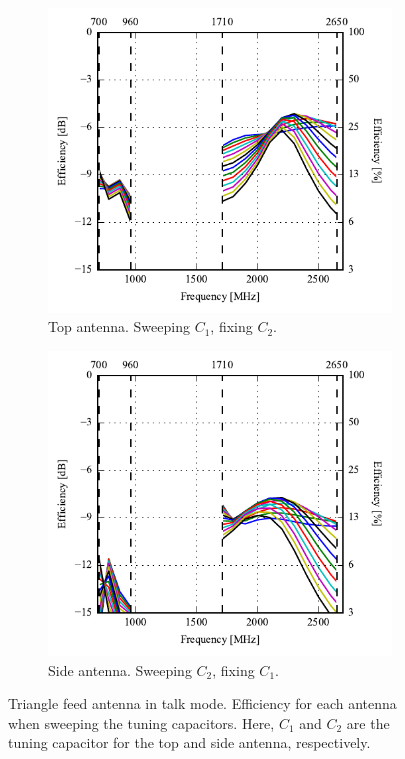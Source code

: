 \begin{figure}[htbp]
    \centering
    \begin{subfigure}{0.49\linewidth}
        \centering
        \includegraphics{img/tech_sol/trianglefeed/talk_mode/efficiency-ac1-Csh1.pdf}
        \caption{Top antenna. Sweeping $C_1$, fixing $C_2$.}
    \end{subfigure}
    \hfill
    \begin{subfigure}{0.49\linewidth}
        \centering
        \includegraphics{img/tech_sol/trianglefeed/talk_mode/efficiency-ac2-Csh2.pdf}
        \caption{Side antenna. Sweeping $C_2$, fixing $C_1$.}
    \end{subfigure}
    \caption{Triangle feed antenna in talk mode. Efficiency for each antenna when sweeping the tuning capacitors. Here, $C_1$ and $C_2$ are the tuning capacitor for the top and side antenna, respectively.}
    \label{fig:eff_sol2talk}
\end{figure}


